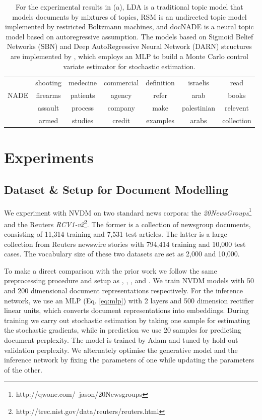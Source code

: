\documentclass{article}
\begin{document}
\begin{table}[!tb]
{\begin{tabular}{l|c|c|c|c|c|c}
	& shooting	&  medecine 	& commercial	& definition	&  israelis		&  read		 \\
NADE		& firearms	&  patients 	& agency 	& refer		&  arab			&  books		 \\
	& assault	&  process 	& company 	& make		&  palestinian	&  relevent	 \\
	& armed		&  studies 	& credit 	& examples	&  arabs			&  collection	 \\
\bottomrule[1.2pt]
\end{tabular}
\label{tb:nw}   
}
\caption{For the experimental results in (a), LDA \citep{blei2003latent} is a traditional topic model that models documents by mixtures of topics, RSM \citep{hinton2009replicated} is an undirected topic model implemented by restricted Boltzmann machines, and docNADE \citep{larochelle2012neural} is a neural topic model based on autoregressive assumption. The models based on Sigmoid Belief Networks (SBN) and Deep AutoRegressive Neural Network (DARN) structures are implemented by \citet{mnih2014neural}, which employs an MLP to build a Monte Carlo control variate estimator for stochastic estimation. }
\end{table}

\section{Experiments}
\subsection{Dataset \& Setup for Document Modelling}
We experiment with NVDM on two standard news corpora: the \textit{20NewsGroups}\footnote{http://qwone.com/~jason/20Newsgroups} and the Reuters \textit{RCV1-v2}\footnote{http://trec.nist.gov/data/reuters/reuters.html}. 
The former is a collection of newsgroup documents, consisting of 11,314 training and 7,531 test articles. 
The latter is a large collection from Reuters newswire stories with 794,414 training and 10,000 test cases. 
The vocabulary size of these two datasets are set as 2,000 and 10,000.

To make a direct comparison with the prior work we follow the same preprocessing procedure and setup as \citet{hinton2009replicated}, \citet{larochelle2012neural}, \citet{Srivastava2013}, and \citet{mnih2014neural}.
We train NVDM models with 50 and 200 dimensional document representations respectively. 
For the inference network, we use an MLP (Eq. \ref{eq:mlp}) with 2 layers and 500 dimension rectifier linear units, which converts document representations into embeddings.
During training we carry out stochastic estimation by taking one sample for estimating the stochastic gradients, while in prediction we use 20 samples for predicting document perplexity. 
The model is trained by Adam \citep{DBLP:journals/corr/KingmaB14} and tuned by hold-out validation perplexity. We alternately optimise the generative model and the inference network by fixing the parameters of one while updating the parameters of the other. 
\end{document}
